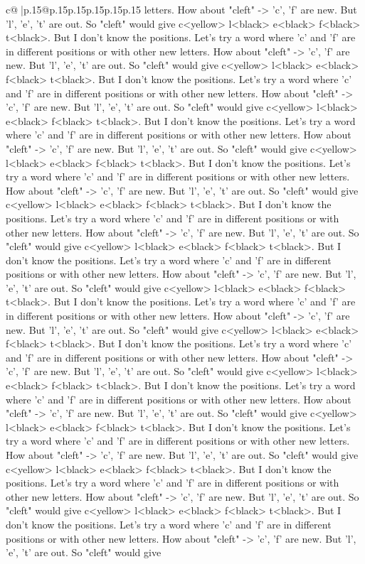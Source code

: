 \documentclass{article}
\begin{document}
{\begin{supertabular}{c@{$\;$}|p{.15\linewidth}@{}p{.15\linewidth}p{.15\linewidth}p{.15\linewidth}p{.15\linewidth}p{.15\linewidth}}
{{{letters. How about "cleft" {-}> 'c', 'f' are new. But 'l', 'e', 't' are out. So "cleft" would give c<yellow> l<black> e<black> f<black> t<black>. But I don't know the positions. Let's try a word where 'c' and 'f' are in different positions or with other new letters. How about "cleft" {-}> 'c', 'f' are new. But 'l', 'e', 't' are out. So "cleft" would give c<yellow> l<black> e<black> f<black> t<black>. But I don't know the positions. Let's try a word where 'c' and 'f' are in different positions or with other new letters. How about "cleft" {-}> 'c', 'f' are new. But 'l', 'e', 't' are out. So "cleft" would give c<yellow> l<black> e<black> f<black> t<black>. But I don't know the positions. Let's try a word where 'c' and 'f' are in different positions or with other new letters. How about "cleft" {-}> 'c', 'f' are new. But 'l', 'e', 't' are out. So "cleft" would give c<yellow> l<black> e<black> f<black> t<black>. But I don't know the positions. Let's try a word where 'c' and 'f' are in different positions or with other new letters. How about "cleft" {-}> 'c', 'f' are new. But 'l', 'e', 't' are out. So "cleft" would give c<yellow> l<black> e<black> f<black> t<black>. But I don't know the positions. Let's try a word where 'c' and 'f' are in different positions or with other new letters. How about "cleft" {-}> 'c', 'f' are new. But 'l', 'e', 't' are out. So "cleft" would give c<yellow> l<black> e<black> f<black> t<black>. But I don't know the positions. Let's try a word where 'c' and 'f' are in different positions or with other new letters. How about "cleft" {-}> 'c', 'f' are new. But 'l', 'e', 't' are out. So "cleft" would give c<yellow> l<black> e<black> f<black> t<black>. But I don't know the positions. Let's try a word where 'c' and 'f' are in different positions or with other new letters. How about "cleft" {-}> 'c', 'f' are new. But 'l', 'e', 't' are out. So "cleft" would give c<yellow> l<black> e<black> f<black> t<black>. But I don't know the positions. Let's try a word where 'c' and 'f' are in different positions or with other new letters. How about "cleft" {-}> 'c', 'f' are new. But 'l', 'e', 't' are out. So "cleft" would give c<yellow> l<black> e<black> f<black> t<black>. But I don't know the positions. Let's try a word where 'c' and 'f' are in different positions or with other new letters. How about "cleft" {-}> 'c', 'f' are new. But 'l', 'e', 't' are out. So "cleft" would give c<yellow> l<black> e<black> f<black> t<black>. But I don't know the positions. Let's try a word where 'c' and 'f' are in different positions or with other new letters. How about "cleft" {-}> 'c', 'f' are new. But 'l', 'e', 't' are out. So "cleft" would give c<yellow> l<black> e<black> f<black> t<black>. But I don't know the positions. Let's try a word where 'c' and 'f' are in different positions or with other new letters. How about "cleft" {-}> 'c', 'f' are new. But 'l', 'e', 't' are out. So "cleft" would give c<yellow> l<black> e<black> f<black> t<black>. But I don't know the positions. Let's try a word where 'c' and 'f' are in different positions or with other new letters. How about "cleft" {-}> 'c', 'f' are new. But 'l', 'e', 't' are out. So "cleft" would give }}}
\end{supertabular}}
\end{document}
